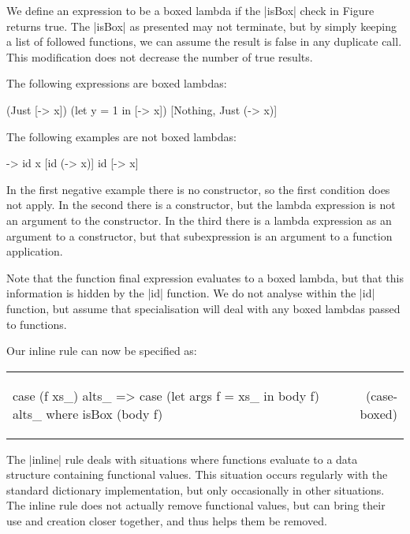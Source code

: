 \documentclass[preprint]{sigplanconf}
\newcommand{\simp}[2]{\vspace{-7mm} #2 & (#1) \\}
\newenvironment{simplify}
    {\noindent
     \begin{flushright}
     \begin{tabular}{p{6.5cm}r}
    }
    {\end{tabular}
     \vspace{-7mm}
     \end{flushright}
    }
\begin{document}
We define an expression to be a boxed lambda if the |isBox| check in Figure \label{fig:boxed_lambda} returns true. The |isBox| as presented may not terminate, but by simply keeping a list of followed functions, we can assume the result is false in any duplicate call. This modification does not decrease the number of true results.

\begin{example}
The following expressions are boxed lambdas:

\begin{code}
[\x -> x]
(Just [\x -> x])
(let y = 1 in [\x -> x])
[Nothing, Just (\x -> x)]
\end{code}

The following examples are not boxed lambdas:

\begin{code}
\x -> id x
[id (\x -> x)]
id [\x -> x]
\end{code}

In the first negative example there is no constructor, so the first condition does not apply. In the second there is a constructor, but the lambda expression is not an argument to the constructor. In the third there is a lambda expression as an argument to a constructor, but that subexpression is an argument to a function application.

Note that the function final expression evaluates to a boxed lambda, but that this information is hidden by the |id| function. We do not analyse within the |id| function, but assume that specialisation will deal with any boxed lambdas passed to functions.
\end{example}

Our inline rule can now be specified as:

\begin{simplify}

\simp{case-boxed}{
\begin{code}
case (f xs_) alts_
    => case (let args f = xs_ in body f) alts_
    where isBox (body f)
\end{code}}

\end{simplify}

The |inline| rule deals with situations where functions evaluate to a data structure containing functional values. This situation occurs regularly with the standard dictionary implementation, but only occasionally in other situations. The inline rule does not actually remove functional values, but can bring their use and creation closer together, and thus helps them be removed.
\end{document}
